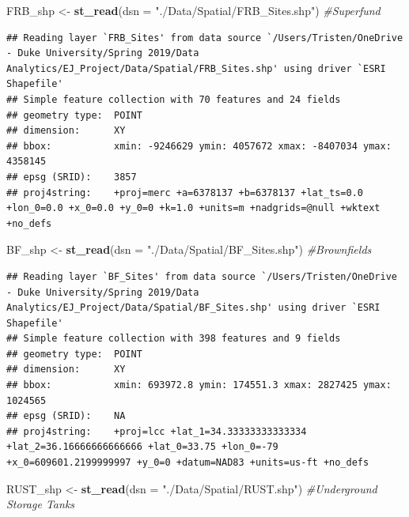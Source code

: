 \documentclass[12pt,]{article}
\newenvironment{Shaded}{\begin{snugshade}}{\end{snugshade}}
\newcommand{\KeywordTok}[1]{\textcolor[rgb]{0.13,0.29,0.53}{\textbf{#1}}}
\newcommand{\DataTypeTok}[1]{\textcolor[rgb]{0.13,0.29,0.53}{#1}}
\newcommand{\StringTok}[1]{\textcolor[rgb]{0.31,0.60,0.02}{#1}}
\newcommand{\CommentTok}[1]{\textcolor[rgb]{0.56,0.35,0.01}{\textit{#1}}}
\newcommand{\NormalTok}[1]{#1}
\begin{document}
\begin{Shaded}
\begin{Highlighting}[]
\NormalTok{FRB_shp <-}\StringTok{ }\KeywordTok{st_read}\NormalTok{(}\DataTypeTok{dsn =} \StringTok{"./Data/Spatial/FRB_Sites.shp"}\NormalTok{) }\CommentTok{#Superfund}
\end{Highlighting}
\end{Shaded}

\begin{verbatim}
## Reading layer `FRB_Sites' from data source `/Users/Tristen/OneDrive - Duke University/Spring 2019/Data Analytics/EJ_Project/Data/Spatial/FRB_Sites.shp' using driver `ESRI Shapefile'
## Simple feature collection with 70 features and 24 fields
## geometry type:  POINT
## dimension:      XY
## bbox:           xmin: -9246629 ymin: 4057672 xmax: -8407034 ymax: 4358145
## epsg (SRID):    3857
## proj4string:    +proj=merc +a=6378137 +b=6378137 +lat_ts=0.0 +lon_0=0.0 +x_0=0.0 +y_0=0 +k=1.0 +units=m +nadgrids=@null +wktext +no_defs
\end{verbatim}

\begin{Shaded}
\begin{Highlighting}[]
\NormalTok{BF_shp <-}\StringTok{ }\KeywordTok{st_read}\NormalTok{(}\DataTypeTok{dsn =} \StringTok{"./Data/Spatial/BF_Sites.shp"}\NormalTok{) }\CommentTok{#Brownfields}
\end{Highlighting}
\end{Shaded}

\begin{verbatim}
## Reading layer `BF_Sites' from data source `/Users/Tristen/OneDrive - Duke University/Spring 2019/Data Analytics/EJ_Project/Data/Spatial/BF_Sites.shp' using driver `ESRI Shapefile'
## Simple feature collection with 398 features and 9 fields
## geometry type:  POINT
## dimension:      XY
## bbox:           xmin: 693972.8 ymin: 174551.3 xmax: 2827425 ymax: 1024565
## epsg (SRID):    NA
## proj4string:    +proj=lcc +lat_1=34.33333333333334 +lat_2=36.16666666666666 +lat_0=33.75 +lon_0=-79 +x_0=609601.2199999997 +y_0=0 +datum=NAD83 +units=us-ft +no_defs
\end{verbatim}

\begin{Shaded}
\begin{Highlighting}[]
\NormalTok{RUST_shp <-}\StringTok{ }\KeywordTok{st_read}\NormalTok{(}\DataTypeTok{dsn =} \StringTok{"./Data/Spatial/RUST.shp"}\NormalTok{) }\CommentTok{#Underground Storage Tanks}
\end{Highlighting}
\end{Shaded}
\end{document}
